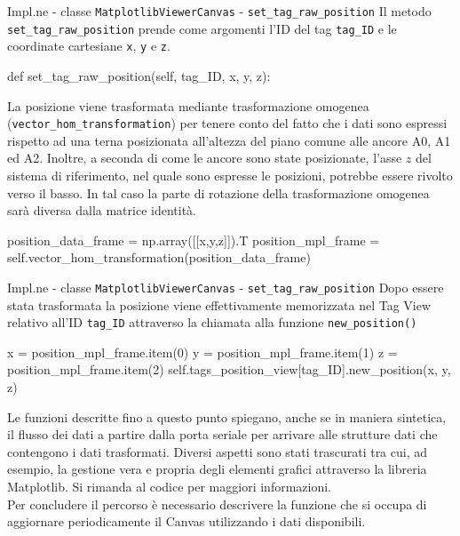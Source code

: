 \begin{frame}[fragile, shrink=15]{Impl.ne - classe \lstinline!MatplotlibViewerCanvas! - \lstinline!set_tag_raw_position!}
  Il metodo \lstinline!set_tag_raw_position! prende come argomenti l'ID del tag \lstinline!tag_ID! e le coordinate cartesiane
  \lstinline!x!, \lstinline!y! e \lstinline!z!.

  \begin{Python}
    def set_tag_raw_position(self, tag_ID, x, y, z):
  \end{Python}

  La posizione viene trasformata mediante trasformazione omogenea (\lstinline!vector_hom_transformation!) per tenere conto del fatto
  che i dati sono espressi rispetto ad una terna posizionata all'altezza del piano comune alle
  ancore A0, A1 ed A2. Inoltre, a seconda di come le ancore sono state posizionate, l'asse $z$
  del sistema di riferimento, nel quale sono espresse le posizioni, potrebbe essere rivolto verso il basso.
  In tal caso la parte di rotazione della trasformazione omogenea sarà diversa dalla matrice identità.
  \begin{Python}
        position_data_frame = np.array([[x,y,z]]).T
        position_mpl_frame = self.vector_hom_transformation(position_data_frame)

  \end{Python}
\end{frame}

\begin{frame}[fragile, shrink=10]{Impl.ne - classe \lstinline!MatplotlibViewerCanvas! - \lstinline!set_tag_raw_position!}
  Dopo essere stata trasformata la posizione viene effettivamente memorizzata nel Tag View relativo
  all'ID \lstinline!tag_ID! attraverso la chiamata alla funzione \lstinline!new_position()!
  \begin{Python}
        x = position_mpl_frame.item(0)
        y = position_mpl_frame.item(1)
        z = position_mpl_frame.item(2)
        self.tags_position_view[tag_ID].new_position(x, y, z)
  \end{Python}

  Le funzioni descritte fino a questo punto spiegano, anche se in maniera sintetica,
  il flusso dei dati a partire dalla porta seriale per arrivare alle strutture dati
  che contengono i dati trasformati. Diversi aspetti sono stati trascurati tra cui,
  ad esempio, la gestione vera e propria degli elementi grafici attraverso la libreria
  Matplotlib. Si rimanda al codice per maggiori informazioni.\\
  Per concludere il percorso è necessario descrivere la funzione che si occupa di aggiornare
  periodicamente il Canvas utilizzando i dati disponibili.
\end{frame}

